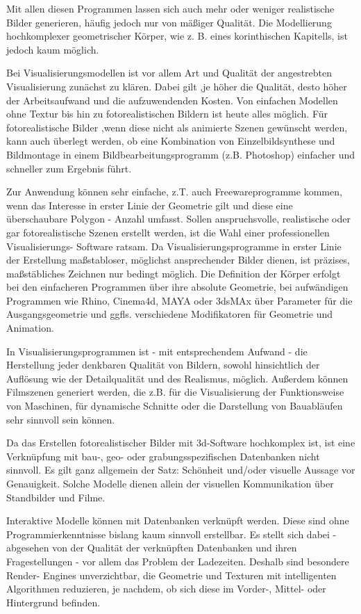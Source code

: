 Mit allen diesen Programmen lassen sich auch mehr oder weniger realistische Bilder generieren, häufig jedoch nur von mäßiger Qualität. Die Modellierung hochkomplexer geometrischer Körper, wie z. B. eines korinthischen Kapitells, ist jedoch kaum möglich. 

Bei Visualisierungsmodellen ist vor allem Art und Qualität der angestrebten Visualisierung zunächst zu klären. Dabei gilt ,je höher die Qualität, desto höher der Arbeitsaufwand und die aufzuwendenden Kosten. Von einfachen Modellen ohne Textur bis hin zu fotorealistischen Bildern ist heute alles möglich. Für fotorealistische Bilder ,wenn diese nicht als animierte Szenen gewünscht werden, kann auch überlegt werden, ob eine Kombination von Einzelbildsynthese und Bildmontage in einem Bildbearbeitungsprogramm (z.B. Photoshop) einfacher und schneller zum Ergebnis führt.

Zur Anwendung können sehr einfache, z.T. auch Freewareprogramme kommen, wenn das Interesse in erster Linie der Geometrie gilt und diese eine überschaubare Polygon - Anzahl umfasst. Sollen anspruchsvolle, realistische oder gar fotorealistische Szenen erstellt werden, ist die Wahl einer professionellen Visualisierungs- Software ratsam. Da Visualisierungsprogramme in erster Linie der Erstellung maßstabloser, möglichst ansprechender Bilder dienen, ist präzises, maßstäbliches Zeichnen nur bedingt möglich. Die Definition der Körper erfolgt bei den einfacheren Programmen über ihre absolute Geometrie, bei aufwändigen Programmen wie Rhino, Cinema4d, MAYA oder 3dsMAx über Parameter für die Ausgangsgeometrie und ggfls. verschiedene Modifikatoren für Geometrie und Animation.

In Visualisierungsprogrammen ist - mit entsprechendem Aufwand - die Herstellung jeder denkbaren Qualität von Bildern, sowohl hinsichtlich der Auflösung wie der Detailqualität und des Realismus, möglich. Außerdem können Filmszenen generiert werden, die z.B. für die Visualisierung der Funktionsweise von Maschinen, für dynamische Schnitte oder die Darstellung von Bauabläufen sehr sinnvoll sein können. 

Da das Erstellen fotorealistischer Bilder mit 3d-Software hochkomplex ist, ist eine Verknüpfung mit bau-, geo- oder grabungsspezifischen Datenbanken nicht sinnvoll. Es gilt ganz allgemein der Satz: Schönheit und/oder visuelle Aussage vor Genauigkeit. Solche Modelle dienen allein der visuellen Kommunikation über Standbilder und Filme. 

Interaktive Modelle können mit Datenbanken verknüpft werden. Diese sind ohne Programmierkenntnisse bislang kaum sinnvoll erstellbar. Es stellt sich dabei  - abgesehen von der Qualität der verknüpften Datenbanken und ihren Fragestellungen - vor allem das Problem der Ladezeiten. Deshalb sind besondere Render- Engines unverzichtbar, die Geometrie und Texturen mit intelligenten Algorithmen reduzieren, je nachdem, ob sich diese im Vorder-, Mittel- oder Hintergrund befinden. 

